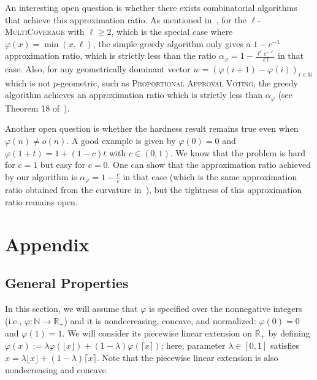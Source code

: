 An interesting open question is whether there exists combinatorial algorithms that achieve this approximation ratio. As mentioned in~\cite{BFGG20}, for the $\ell$-\textsc{MultiCoverage} with $\ell \geq 2$, which is the special case where $\varphi(x) = \min(x,\ell)$, the simple greedy algorithm only gives a $1 - e^{-1}$ approximation ratio, which is strictly less than the ratio $\alpha_{\varphi} = 1-\frac{\ell^{\ell}e^{-\ell}}{\ell!}$ in that case. Also, for any geometrically dominant vector $w=(\varphi(i+1)-\varphi(i))_{i \in \mathbb{N}}$ which is not $p$-geometric, such as \textsc{Proportional Approval Voting}, the greedy algorithm achieves an approximation ratio which is strictly less than $\alpha_{\varphi}$ (see Theorem 18 of~\cite{DMMS20}).

Another open question is whether the hardness result remains true even when $\varphi(n) \not= o(n)$. A good example is given by $\varphi(0)=0$ and $\varphi(1+t) = 1 + (1-c)t$ with $c \in (0,1)$. We know that the problem is hard for $c=1$ but easy for $c=0$. One can show that the approximation ratio achieved by our algorithm is $\alpha_{\varphi} = 1 - \frac{c}{e}$ in that case (which is the same approximation ratio obtained from the curvature in~\cite{SVW17}), but the tightness of this approximation ratio remains open.

\newpage
\section{Appendix}
\subsection{General Properties}
In this section, we will assume that $\varphi$ is specified over the nonnegative integers (i.e., $\varphi : \mathbb{N} \rightarrow \mathbb{R}_+$) and it is nondecreasing, concave, and normalized: $\varphi(0)=0$ and $\varphi(1)=1$. We will consider its piecewise linear extension on  $\mathbb{R}_+$ by defining $\varphi(x) := \lambda \varphi(\lfloor x \rfloor) + (1-\lambda)\varphi(\lceil x \rceil)$; here, parameter $\lambda\in [0,1]$ satisfies $x = \lambda\lfloor x \rfloor + (1-\lambda)\lceil x \rceil$. Note that the piecewise linear extension is also nondecreasing and concave.


